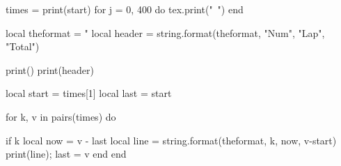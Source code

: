 \documentclass[a4paper]{scrartcl}
\begin{document}
\begin{luacode*}

  times = {}
  print(start)
  for j = 0, 400 do
     tex.print("\ ")
  end

\end{luacode*}


\begin{luacode}

  local theformat = "%
  local header = string.format(theformat, "Num", "Lap", "Total")

  print()
  print(header)

  local start = times[1]
  local last = start

  for k, v in pairs(times) do

  if k %
     local now = v - last
     local line = string.format(theformat, k, now, v-start)
     print(line); last = v
  end
  end

\end{luacode}
\end{document}
